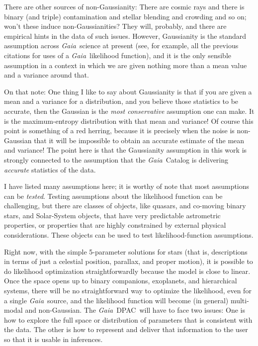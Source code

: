 \documentclass[12pt, modern]{aastex62h}
\newcommand{\acronym}[1]{{\small{#1}}}
\newcommand{\Gaia}{\textsl{Gaia}}
\newcommand{\DPAC}{{\acronym{DPAC}}}
\begin{document}
There are other sources of non-Gaussianity:
There are cosmic rays and there is binary (and triple)
contamination and stellar blending and crowding and so on; won't these
induce non-Gaussianities?
They will, probably, and there are empirical hints in the data
of such issues.
However, Gaussianity is the standard assumption across \Gaia\ science at
present (see, for example, all the previous citations for uses of a
\Gaia\ likelihood function), and it is the only sensible assumption in a
context in which we are given nothing more than a mean value and a variance
around that.

On that note: One thing I like to say about Gaussianity is that if you are given a mean
and a variance for a distribution, and you believe those statistics to be
accurate, then the Gaussian is the \emph{most conservative} assumption one
can make.
It is the maximum-entropy distribution with that mean and variance!
Of course this point is something of a red herring, because it is precisely
when the noise is non-Gaussian that it will be impossible to obtain an
accurate estimate of the mean and variance!
The point here is that the Gaussianity assumption in this work is strongly connected
to the assumption that the \Gaia\ Catalog is delivering \emph{accurate} statistics of
the data.

I have listed many assumptions here; it is worthy of note that most
assumptions can be \emph{tested}.
Testing assumptions about the likelihood function can be challenging,
but there are classes of objects, like quasars, and co-moving binary stars,
and Solar-System objects, that have very predictable astrometric properties,
or properties that are highly constrained by external physical considerations.
These objects can be used to test likelihood-function assumptions.

Right now, with the simple 5-parameter solutions for stars (that is, descriptions
in terms of just a celestial position, parallax, and proper motion), it is possible
to do likelihood optimization straightforwardly because the model is close to linear.
Once the space opens up to binary companions, exoplanets, and hierarchical systems,
there will be no straightforward way to optimize the likelihood, even for
a single \Gaia\ source, and the likelihood function will become
(in general) multi-modal and non-Gaussian.
The \Gaia\ \DPAC\ will have to face two issues:
One is how to explore the full space or distribution of parameters that is
consistent with the data.
The other is how to represent and deliver that information to the user
so that it is usable in inferences.
\end{document}

